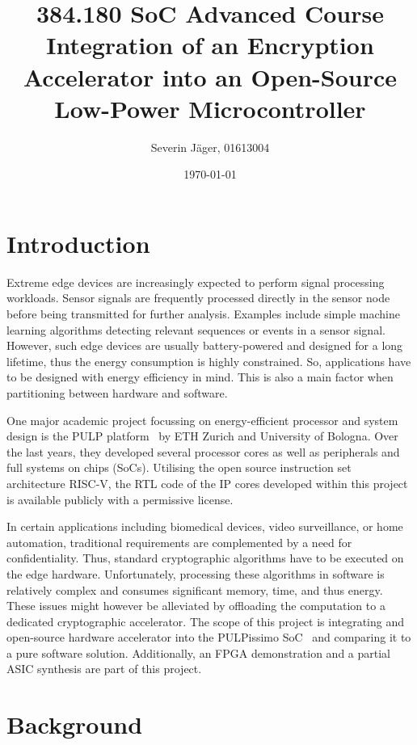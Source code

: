 \documentclass[a4paper, 12pt]{article}
\title{384.180 SoC Advanced Course\\
	   Integration of an Encryption Accelerator
	   into an Open-Source Low-Power Microcontroller}
\author{
  Severin Jäger, 01613004
}
\date{\today}
\begin{document}
\maketitle
\tableofcontents
\pagebreak

\section{Introduction} \label{sec:intro}

Extreme edge devices are increasingly expected to perform signal processing workloads. Sensor signals are frequently processed directly in the sensor node before being transmitted for further analysis. Examples include simple machine learning algorithms detecting relevant sequences or events in a sensor signal. However, such edge devices are usually battery-powered and designed for a long lifetime, thus the energy consumption is highly constrained. So, applications have to be designed with energy efficiency in mind. This is also a main factor when partitioning between hardware and software.

One major academic project focussing on energy-efficient processor and system design is the PULP platform~\cite{pulp} by ETH Zurich and University of Bologna. Over the last years, they developed several processor cores as well as peripherals and full systems on chips (SoCs). Utilising the open source instruction set architecture RISC-V, the RTL code of the IP cores developed within this project is available publicly with a permissive license.

In certain applications including biomedical devices, video surveillance, or home automation, traditional requirements are complemented by a need for confidentiality. Thus, standard cryptographic algorithms have to be executed on the edge hardware. Unfortunately, processing these algorithms in software is relatively complex and consumes significant memory, time, and thus energy. These issues might however be alleviated by offloading the computation to a dedicated cryptographic accelerator. The scope of this project is integrating and open-source hardware accelerator into the PULPissimo SoC~\cite{Schiavone2018} and comparing it to a pure software solution. Additionally, an FPGA demonstration and a partial ASIC synthesis are part of this project.

\section{Background} \label{sec:background}
\end{document}
